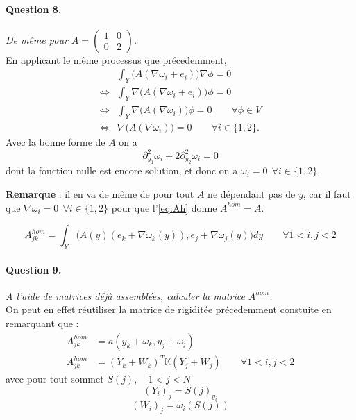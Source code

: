 \message{ !name(rapport.tex)}\documentclass[11pt]{article}
\newcommand{\K}{\mathbb{K}}
\newcommand{\Ah}{A^{hom}}
\newcommand{\question}[2]{\paragraph{Question #1.}\textit{#2} \\}
\begin{document}
\question{8}{De même pour
$A = \left(\begin{matrix}
  1 & 0 \\
  0 & 2 
\end{matrix}\right)$.
}
En applicant le même processus que précedemment,
\begin{align*}
  &\int_Y \big(A(\nabla \omega_i+e_i)\big) \nabla \phi = 0  \\
  \iff&\int_Y \nabla \big(A(\nabla \omega_i+e_i)\big) \phi = 0 \\
  \iff&\int_Y \nabla \big(A(\nabla \omega_i)\big) \phi = 0 \qquad \forall \phi \in V\\
  \iff&\nabla \big(A(\nabla \omega_i)\big)=0 \qquad \forall i \in \{1,2\}.
\end{align*}
Avec la bonne forme de $A$ on a 
\[
  \partial^2_{y_1} \omega_i + 2\partial^2_{y_2} \omega_i = 0 
\]
dont la fonction nulle est encore solution, et donc on a 
$
  \omega_i = 0~~\forall i \in\{1,2\}.
$

\noindent
\textbf{Remarque} : il en va de même de pour tout $A$ ne dépendant pas de $y$, car il faut que
$
  \nabla \omega_i = 0~~\forall i \in\{1,2\}
$
pour que l'\autoref{eq:Ah} donne $\Ah = A$.

\begin{equation}
  \label{eq:Ah}
  \Ah_{jk} = \int_Y \big(A(y)(e_k+\nabla \omega_k(y)), e_j+\nabla \omega_j(y)\big) dy \qquad \forall 1<i,j<2
\end{equation}

\question{9}{A l'aide de matrices déjà assemblées, calculer la matrice $\Ah$.}
On peut en effet réutiliser la matrice de rigiditée précedemment constuite en remarquant que :
\begin{align*}
  \Ah_{jk} &= a(y_k+\omega_k, y_j+\omega_j) \\
  \Ah_{jk} &= (Y_k + W_k)^T \K (Y_j + W_j) \qquad \forall 1<i,j<2
\end{align*}
avec pour tout sommet $S(j), \quad 1<j<N $
\[
  (Y_i)_j = S(j)_{y_i} 
\]
\[
  (W_i)_j = \omega_i(S(j))
\]
\end{document}
